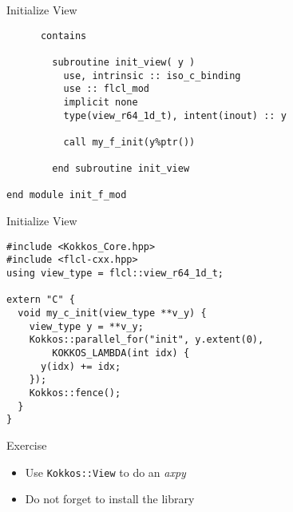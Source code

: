 \begin{frame}[containsverbatim]{Initialize View}
  \begin{verbatim}
      contains

        subroutine init_view( y )
          use, intrinsic :: iso_c_binding
          use :: flcl_mod
          implicit none
          type(view_r64_1d_t), intent(inout) :: y

          call my_f_init(y%ptr())

        end subroutine init_view
  
end module init_f_mod
  \end{verbatim}
\end{frame}

\begin{frame}[containsverbatim]{Initialize View}
  \begin{verbatim}
#include <Kokkos_Core.hpp>
#include <flcl-cxx.hpp>
using view_type = flcl::view_r64_1d_t;

extern "C" {
  void my_c_init(view_type **v_y) {
    view_type y = **v_y;
    Kokkos::parallel_for("init", y.extent(0), 
        KOKKOS_LAMBDA(int idx) {
      y(idx) += idx;
    });
    Kokkos::fence();
  }
}
  \end{verbatim}
\end{frame}

\begin{frame}{Exercise}
  \begin{itemize}
    \item Use \texttt{Kokkos::View} to do an \emph{axpy}
    \item Do not forget to install the library
  \end{itemize}
\end{frame}


